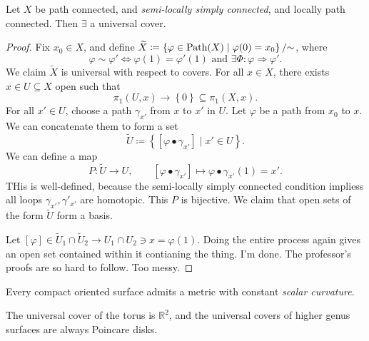 \begin{theorem}\label{thm:a}
	Let $X$ be path connected, and \emph{semi-locally simply connected}, and locally path connected. Then $\exists $ a universal cover.
\end{theorem}
\begin{proof}
	Fix $x_0\in X$, and define $\widetilde{X} \coloneqq \left\{ \varphi \in \operatorname{Path} (X)\mid \varphi (0)=x_0 \right\} /\mathbin{\sim}$, where
	\[
		\varphi \sim \varphi ' \iff \varphi (1)=\varphi' (1)\text{ and } \exists \Phi : \varphi  \Rightarrow \varphi '
	.\]
	We claim $\widetilde{X} $ is universal with respect to covers. For all $x\in X$, there exists $x\in U\subseteq X$ open such that
	\[
		\pi _1(U,x)\to \left\{ 0 \right\} \subseteq \pi_1(X,x)
	.\]
	For all $x'\in U$, choose a path $\gamma _{x'} $ from $x$ to $x'$ in $U$. Let $\varphi $ be a path from $x_0$ to $x$. We can concatenate them to form a set
	\[
		\widetilde{U} \coloneqq \left\{ \left[ \varphi \bullet \gamma_{x'} \right] \mid x' \in U \right\} 
	.\]
	We can define a map
	\[
		P : \widetilde{U}  \to U,\qquad [\varphi \bullet \gamma_{x'} ]\mapsto \varphi \bullet \gamma_{x'} (1)=x'
	.\]
	THis is well-defined, because the semi-locally simply connected condition impliess all loops $\gamma_{x'} ,\gamma'_{x'} $ are homotopic. This $P$ is bijective. We claim that open sets of the form $\widetilde{U} $ form a basis.

	Let $[\varphi ]\in \widetilde{U}_1 \cap \widetilde{U} _2\to U_1 \cap U_2 \ni x=\varphi (1)$.  Doing the entire process again gives an open set contained within it contianing the thing. I'm done. The professor's proofs are so hard to follow. Too messy.
\end{proof}
\begin{corollary}\label{cor:}
	Every compact oriented surface admits a metric with constant \emph{scalar curvature}.
\end{corollary}

The universal cover of the torus is $\mathbb{R} ^2$, and the universal covers of higher genus surfaces are always Poincare disks.

